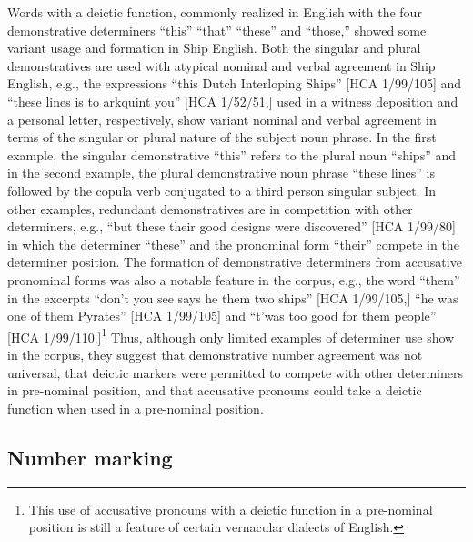   Words with a deictic function, commonly realized in English with the four demonstrative determiners “this” “that” “these” and “those,” showed some variant usage and formation in Ship English. Both the singular and plural demonstratives are used with atypical nominal and verbal agreement in Ship English, e.g., the expressions “this Dutch Interloping Ships” [HCA 1/99/105] and “these lines is to arkquint you” [HCA 1/52/51,] used in a witness deposition and a personal letter, respectively, show variant nominal and verbal agreement in terms of the singular or plural nature of the subject noun phrase. In the first example, the singular demonstrative “this” refers to the plural noun “ships” and in the second example, the plural demonstrative noun phrase “these lines” is followed by the copula verb conjugated to a third person singular subject. In other examples, redundant demonstratives are in competition with other determiners, e.g., “but these their good designs were discovered” [HCA 1/99/80] in which the determiner “these” and the pronominal form “their” compete in the determiner position. The formation of demonstrative determiners from accusative pronominal forms was also a notable feature in the corpus, e.g., the word “them” in the excerpts “don’t you see says he them two ships” [HCA 1/99/105,] “he was one of them Pyrates” [HCA 1/99/105] and “t’was too good for them people” [HCA 1/99/110.]\footnote{This use of accusative pronouns with a deictic function in a pre-nominal position is still a feature of certain vernacular dialects of English.} Thus, although only limited examples of determiner use show in the corpus, they suggest that demonstrative number agreement was not universal, that deictic markers were permitted to compete with other determiners in pre-nominal position, and that accusative pronouns could take a deictic function when used in a pre-nominal position.  

\subsection{\textbf{Number} \textbf{marking}}%

